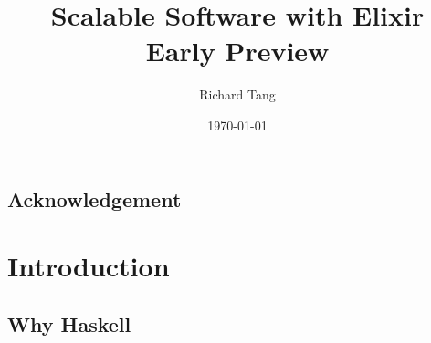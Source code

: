 \documentclass{kdp}
\title{Scalable Software with Elixir \\ Early Preview}
\author{Richard Tang}
\date{\today}
\begin{document}
\maketitle

\section*{Acknowledgement}

\tableofcontents




















\chapter{Introduction}

\section{Why Haskell}
\end{document}
